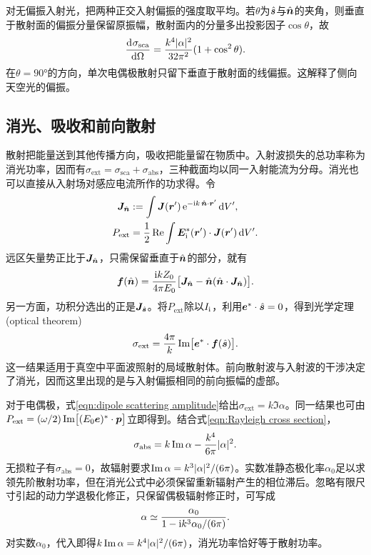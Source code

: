 对无偏振入射光，把两种正交入射偏振的强度取平均。若$\theta$为$\mathop{}\!\hat{\bm{s}}$与$\mathop{}\!\hat{\bm{n}}$的夹角，则垂直于散射面的偏振分量保留原振幅，散射面内的分量多出投影因子$\cos\theta$，故
\begin{equation}
    \label{eq:ed-unpolarized-rayleigh}
    \frac{\mathop{}\!\mathrm{d}^{}\sigma_\mathrm{sca}}{\mathrm{d}{\Omega}^{}} = \frac{k^4\lvert\alpha\rvert^2}{32\pi^2}
       (1 + \cos^2\theta).
\end{equation}
在$\theta = \ang{90}$的方向，单次电偶极散射只留下垂直于散射面的线偏振。这解释了侧向天空光的偏振。

\subsection{消光、吸收和前向散射}

散射把能量送到其他传播方向，吸收把能量留在物质中。入射波损失的总功率称为消光功率，因而有$\sigma_\mathrm{ext} = \sigma_\mathrm{sca} + \sigma_\mathrm{abs}$，三种截面均以同一入射能流为分母。消光也可以直接从入射场对感应电流所作的功求得。令
\begin{align*}
    \bm J_{\mathop{}\!\hat{\bm{n}}} &:= \int\bm J(\bm r')\mathop{}\!\mathrm{e}^{-\mathrm{i} k\mathop{}\!\hat{\bm{n}}\cdot\bm r'}\mathop{}\!\mathrm{d} V',\\
    P_\mathrm{ext} &= \frac12\operatorname{Re}\int\bm E_\mathrm i^*(\bm r') \cdot \bm J(\bm r')\mathop{}\!\mathrm{d} V'.
\end{align*}
远区矢量势正比于$\bm J_{\mathop{}\!\hat{\bm{n}}}$，只需保留垂直于$\mathop{}\!\hat{\bm{n}}$的部分，就有
\[
    \bm f(\mathop{}\!\hat{\bm{n}}) = \frac{\mathrm{i} kZ_0}{4\pi E_0}
    \bigl[\bm J_{\mathop{}\!\hat{\bm{n}}} - \mathop{}\!\hat{\bm{n}}(\mathop{}\!\hat{\bm{n}} \cdot \bm J_{\mathop{}\!\hat{\bm{n}}})\bigr].
\]
另一方面，功积分选出的正是$\bm J_{\mathop{}\!\hat{\bm{s}}}$。将$P_\mathrm{ext}$除以$I_\mathrm i$，利用$\bm e^\ast \cdot \mathop{}\!\hat{\bm{s}} = 0$，得到光学定理(optical theorem)
\begin{equation}
    \sigma_\mathrm{ext} = \frac{4\pi}k\operatorname{Im}\bigl[\bm e^\ast \cdot \bm f(\mathop{}\!\hat{\bm{s}})\bigr].
\end{equation}
这一结果适用于真空中平面波照射的局域散射体。前向散射波与入射波的干涉决定了消光，因而这里出现的是与入射偏振相同的前向振幅的虚部。

对于电偶极，式\eqref{eqn:dipole scattering amplitude}给出$\sigma_\mathrm{ext} = k\Im\alpha$。同一结果也可由$P_\mathrm{ext} = (\omega/2)\operatorname{Im}\bigl[(E_0\bm e)^* \cdot \bm p\bigr]$立即得到。结合式\eqref{eqn:Rayleigh cross section}，
\begin{equation}
    \label{eq:ed-dipole-absorption-cross-section}
    \sigma_\mathrm{abs} = k\operatorname{Im}\alpha - \frac{k^4}{6\pi}\lvert\alpha\rvert^2.
\end{equation}
无损粒子有$\sigma_\mathrm{abs} = 0$，故辐射要求$\operatorname{Im}\alpha = k^3\lvert\alpha\rvert^2/(6\pi)$。实数准静态极化率$\alpha_0$足以求领先阶散射功率，但在消光公式中必须保留重新辐射产生的相位滞后。忽略有限尺寸引起的动力学退极化修正，只保留偶极辐射修正时，可写成
\begin{equation}
    \label{eq:ed-radiation-corrected-polarizability}
    \alpha \simeq \frac{\alpha_0}{1 - \mathrm{i} k^3\alpha_0/(6\pi)}.
\end{equation}
对实数$\alpha_0$，代入即得$k\operatorname{Im}\alpha = k^4\lvert\alpha\rvert^2/(6\pi)$，消光功率恰好等于散射功率。

